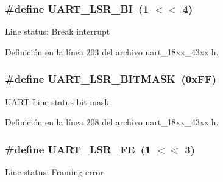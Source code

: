 \subsubsection[{\texorpdfstring{U\+A\+R\+T\+\_\+\+L\+S\+R\+\_\+\+BI}{UART_LSR_BI}}]{\setlength{\rightskip}{0pt plus 5cm}\#define U\+A\+R\+T\+\_\+\+L\+S\+R\+\_\+\+BI~(1 $<$$<$ 4)}\hypertarget{group___u_a_r_t__18_x_x__43_x_x_gaaca4bb43e62c7085534b67576e1ddbeb}{}\label{group___u_a_r_t__18_x_x__43_x_x_gaaca4bb43e62c7085534b67576e1ddbeb}
Line status\+: Break interrupt 

Definición en la línea 203 del archivo uart\+\_\+18xx\+\_\+43xx.\+h.

\subsubsection[{\texorpdfstring{U\+A\+R\+T\+\_\+\+L\+S\+R\+\_\+\+B\+I\+T\+M\+A\+SK}{UART_LSR_BITMASK}}]{\setlength{\rightskip}{0pt plus 5cm}\#define U\+A\+R\+T\+\_\+\+L\+S\+R\+\_\+\+B\+I\+T\+M\+A\+SK~(0x\+F\+F)}\hypertarget{group___u_a_r_t__18_x_x__43_x_x_ga3643d58e12f1d3bf342d140a5e3cb1ae}{}\label{group___u_a_r_t__18_x_x__43_x_x_ga3643d58e12f1d3bf342d140a5e3cb1ae}
U\+A\+RT Line status bit mask 

Definición en la línea 208 del archivo uart\+\_\+18xx\+\_\+43xx.\+h.

\subsubsection[{\texorpdfstring{U\+A\+R\+T\+\_\+\+L\+S\+R\+\_\+\+FE}{UART_LSR_FE}}]{\setlength{\rightskip}{0pt plus 5cm}\#define U\+A\+R\+T\+\_\+\+L\+S\+R\+\_\+\+FE~(1 $<$$<$ 3)}\hypertarget{group___u_a_r_t__18_x_x__43_x_x_ga18b1661d7c37ab40c9310311dd4f647d}{}\label{group___u_a_r_t__18_x_x__43_x_x_ga18b1661d7c37ab40c9310311dd4f647d}
Line status\+: Framing error 

